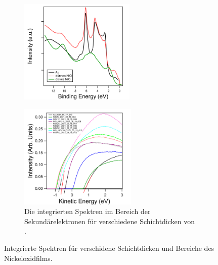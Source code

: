         \begin{figure}
            \centering
            \begin{subfigure}[t]{0.48\textwidth}
                \centering
                \includegraphics[height=5cm]{./content/pictures/NiO/NiO_Filmdicke.png}
                \label{fig:EDC_NiO}
            \end{subfigure}
            \begin{subfigure}[t]{0.48\textwidth}
                \centering
                \includegraphics[height=5cm]{./content/pictures/NiO/NiO_WKF_thickness.png}
                \caption{Die integrierten Spektren im Bereich der Sekundärelektronen für verschiedene Schichtdicken von .}
                \label{fig:WKF_NiO}
            \end{subfigure}
            \caption{Integrierte Spektren für verschidene Schichtdicken und Bereiche des Nickeloxidfilms.}
        \end{figure}
        
